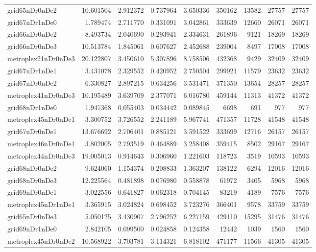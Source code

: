 \begin{longtable}{|l|r|r|r|r|r|r|r|r|}
grid65nDr0nDe2 & 10.601504 & 2.912372 & 0.737964 & 3.650336 & 350162 & 13582 & 27757 & 27757 \\
grid67nDr1nDe0 & 1.789474 & 2.711770 & 0.331091 & 3.042861 & 333639 & 12660 & 26071 & 26071 \\
grid66nDr0nDe2 & 8.493734 & 2.040690 & 0.293941 & 2.334631 & 261896 & 9121 & 18269 & 18269 \\
grid66nDr0nDe3 & 10.513784 & 1.845061 & 0.607627 & 2.452688 & 239004 & 8497 & 17008 & 17008 \\
metroplex21nDr0nDe3 & 20.122807 & 3.450610 & 5.307896 & 8.758506 & 432368 & 9429 & 32409 & 32409 \\
grid67nDr1nDe1 & 3.431078 & 2.329552 & 0.420952 & 2.750504 & 299921 & 11579 & 23632 & 23632 \\
grid67nDr0nDe2 & 6.330827 & 2.897215 & 0.634256 & 3.531471 & 371350 & 13654 & 28257 & 28257 \\
metroplex41nDr0nDe3 & 10.195489 & 3.639709 & 2.377071 & 6.016780 & 459144 & 11313 & 41372 & 41372 \\
grid68nDr1nDe0 & 1.947368 & 0.055403 & 0.034442 & 0.089845 & 6698 & 691 & 977 & 977 \\
metroplex45nDr0nDe1 & 3.300752 & 3.726552 & 2.241189 & 5.967741 & 471357 & 11728 & 41548 & 41548 \\
grid67nDr0nDe1 & 13.676692 & 2.706401 & 0.885121 & 3.591522 & 333699 & 12716 & 26157 & 26157 \\
metroplex46nDr0nDe1 & 3.802005 & 2.793519 & 0.464889 & 3.258408 & 359415 & 8502 & 29167 & 29167 \\
metroplex44nDr0nDe3 & 19.005013 & 0.914643 & 0.306960 & 1.221603 & 118723 & 3519 & 10593 & 10593 \\
grid68nDr0nDe2 & 9.624060 & 1.154374 & 0.208833 & 1.363207 & 138122 & 6294 & 12016 & 12016 \\
grid68nDr0nDe3 & 12.225564 & 0.481898 & 0.076980 & 0.558878 & 61972 & 3405 & 5968 & 5968 \\
grid69nDr0nDe1 & 3.022556 & 0.641827 & 0.062318 & 0.704145 & 83219 & 4189 & 7576 & 7576 \\
metroplex45nDr1nDe1 & 3.365915 & 3.024824 & 0.698452 & 3.723276 & 366401 & 9578 & 33759 & 33759 \\
grid65nDr0nDe3 & 5.050125 & 3.430907 & 2.796252 & 6.227159 & 429110 & 15295 & 31476 & 31476 \\
grid69nDr1nDe0 & 2.842105 & 0.099500 & 0.024858 & 0.124358 & 12442 & 1039 & 1560 & 1560 \\
metroplex45nDr0nDe2 & 10.568922 & 3.703781 & 3.114321 & 6.818102 & 471177 & 11566 & 41305 & 41305 \\

\end{longtable}
